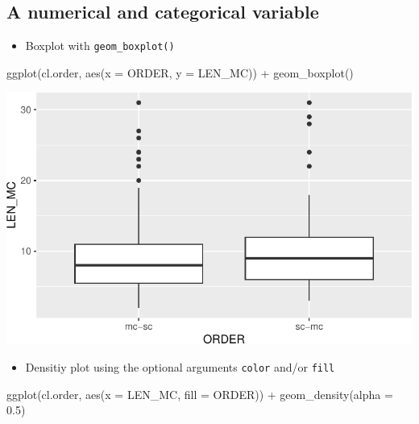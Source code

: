 \documentclass[
  11pt,
  letterpaper,
  DIV=11,
  numbers=noendperiod]{scrreprt}
\newenvironment{Shaded}{\begin{snugshade}}{\end{snugshade}}
\newcommand{\AttributeTok}[1]{\textcolor[rgb]{0.40,0.45,0.13}{#1}}
\newcommand{\FloatTok}[1]{\textcolor[rgb]{0.68,0.00,0.00}{#1}}
\newcommand{\FunctionTok}[1]{\textcolor[rgb]{0.28,0.35,0.67}{#1}}
\newcommand{\NormalTok}[1]{\textcolor[rgb]{0.00,0.23,0.31}{#1}}
\newcommand{\SpecialCharTok}[1]{\textcolor[rgb]{0.37,0.37,0.37}{#1}}
\providecommand{\tightlist}{%
  \setlength{\itemsep}{0pt}\setlength{\parskip}{0pt}}\usepackage{longtable,booktabs,array}
\begin{document}
\subsection{A numerical and categorical
variable}\label{a-numerical-and-categorical-variable}

\begin{itemize}
\tightlist
\item
  Boxplot with \texttt{geom\_boxplot()}
\end{itemize}

\begin{Shaded}
\begin{Highlighting}[]
\FunctionTok{ggplot}\NormalTok{(cl.order, }\FunctionTok{aes}\NormalTok{(}\AttributeTok{x =}\NormalTok{ ORDER, }\AttributeTok{y =}\NormalTok{ LEN\_MC)) }\SpecialCharTok{+}
  \FunctionTok{geom\_boxplot}\NormalTok{()}
\end{Highlighting}
\end{Shaded}

\includegraphics{Summary_statistics_files/figure-pdf/unnamed-chunk-25-1.pdf}

\begin{itemize}
\tightlist
\item
  Densitiy plot using the optional arguments \texttt{color} and/or
  \texttt{fill}
\end{itemize}

\begin{Shaded}
\begin{Highlighting}[]
\FunctionTok{ggplot}\NormalTok{(cl.order, }\FunctionTok{aes}\NormalTok{(}\AttributeTok{x =}\NormalTok{ LEN\_MC, }\AttributeTok{fill =}\NormalTok{ ORDER)) }\SpecialCharTok{+}
  \FunctionTok{geom\_density}\NormalTok{(}\AttributeTok{alpha =} \FloatTok{0.5}\NormalTok{)}
\end{Highlighting}
\end{Shaded}
\end{document}

